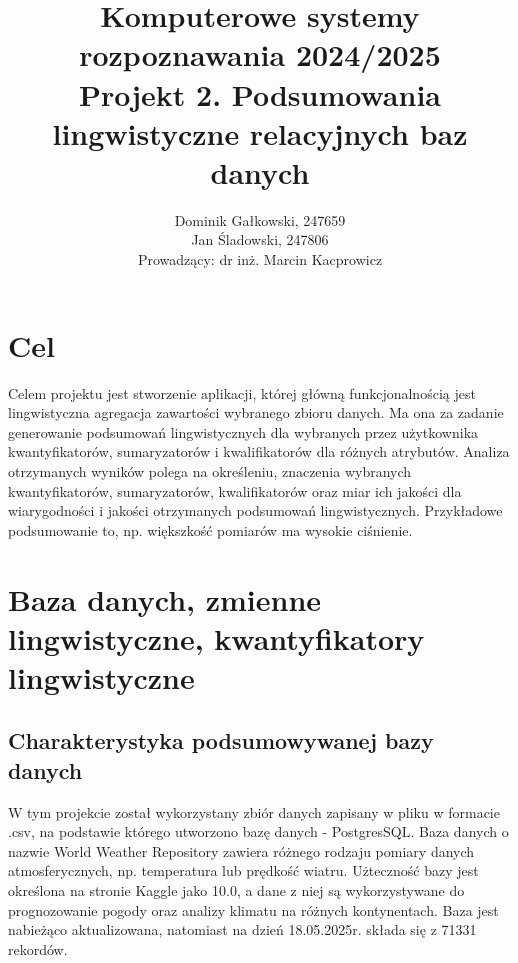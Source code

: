 \documentclass{article}
\author{
	{Dominik Gałkowski, 247659} \\
	{Jan Śladowski, 247806}\\ 
{Prowadzący: dr inż. Marcin Kacprowicz}
}
\title{Komputerowe systemy rozpoznawania 2024/2025\\Projekt 2. Podsumowania lingwistyczne relacyjnych baz danych}
\begin{document}
\maketitle 

\section{Cel}
Celem projektu jest stworzenie aplikacji, której główną funkcjonalnością
jest lingwistyczna agregacja zawartości wybranego zbioru danych. Ma ona za zadanie generowanie podsumowań lingwistycznych dla wybranych przez użytkownika kwantyfikatorów, sumaryzatorów i kwalifikatorów dla różnych atrybutów. Analiza otrzymanych wyników polega na określeniu, znaczenia wybranych kwantyfikatorów, sumaryzatorów, kwalifikatorów oraz miar ich jakości dla wiarygodności i jakości otrzymanych podsumowań lingwistycznych. Przykładowe podsumowanie to, np. większkość pomiarów ma wysokie ciśnienie.


\section{Baza danych, zmienne lingwistyczne, kwantyfikatory lingwistyczne}

\subsection{Charakterystyka podsumowywanej bazy danych}
W tym projekcie został wykorzystany zbiór danych zapisany w pliku w formacie .csv, na podstawie którego utworzono bazę danych - PostgresSQL. Baza danych o nazwie World Weather Repository zawiera różnego rodzaju pomiary danych atmosferycznych, np. temperatura lub prędkość wiatru. \cite{baza} Użteczność bazy jest określona na stronie Kaggle jako 10.0, a dane z niej są wykorzystywane do prognozowanie pogody oraz analizy klimatu na różnych kontynentach. Baza jest nabieżąco aktualizowana, natomiast na dzień 18.05.2025r. składa się z 71331 rekordów. 
\end{document}

